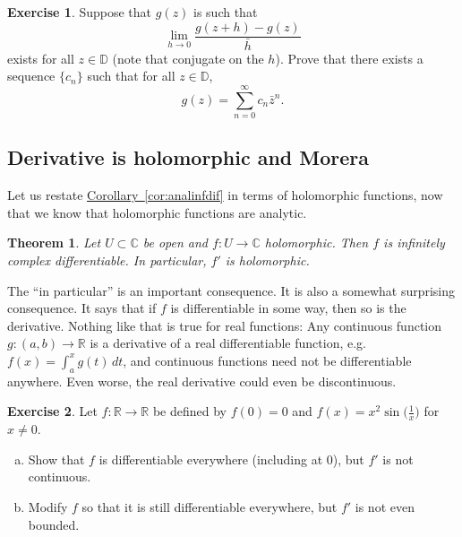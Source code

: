 \documentclass[12pt,openany]{book}
\newcommand{\C}{{\mathbb{C}}}
\newcommand{\R}{{\mathbb{R}}}
\newcommand{\D}{{\mathbb{D}}}
\theoremstyle{plain}
\newtheorem{thm}{Theorem}[section]
\theoremstyle{remark}
\theoremstyle{definition}
\newenvironment{exbox}{%
    \def\FrameCommand{\vrule width 1pt \relax\hspace{10pt}}%
    \MakeFramed{\advance\hsize-\width\FrameRestore}%
}{%
    \endMakeFramed
}
\newenvironment{exparts}{%
    \leavevmode\begin{enumerate}[a),noitemsep,topsep=0pt,parsep=0pt,partopsep=0pt]
}{%
    \end{enumerate}
}
\theoremstyle{exercise}
\newtheorem{exercise}{Exercise}[section]
\theoremstyle{example}
\newcommand{\corref}[1]{\hyperref[#1]{Corollary~\ref*{#1}}}
\begin{document}
\begin{exbox}
\begin{exercise}
Suppose that $g(z)$ is such that
\begin{equation*}
\lim_{h \to 0}
\frac{g(z+h)-g(z)}{\bar{h}}
\end{equation*}
exists for all $z \in \D$ (note that conjugate on the $h$).
Prove that there exists
a sequence $\{ c_n \}$ such that for all $z \in \D$,
\begin{equation*}
g(z) = \sum_{n=0}^\infty c_n \bar{z}^n .
\end{equation*}
\end{exercise}
\end{exbox}

\subsection{Derivative is holomorphic and Morera}

Let us restate \corref{cor:analinfdif} in terms of
holomorphic functions, now that we know that holomorphic functions are
analytic.

\begin{thm} \label{thm:holfuncinfder}
Let $U \subset \C$ be open and $f \colon U \to \C$ holomorphic.  Then
$f$ is infinitely complex differentiable.  In particular, $f'$ is
holomorphic.
\end{thm}

The ``in particular'' is an important consequence.  It is also a somewhat
surprising consequence.
It says that if $f$ is differentiable in some way,
then so is the derivative.  Nothing like that is true for real functions:
Any continuous function $g \colon (a,b) \to \R$ is a derivative
of a real differentiable function, e.g.\ $f(x) = \int_a^x g(t)\,dt$,
and continuous functions need not be differentiable anywhere.
Even worse, the real derivative could even be discontinuous.

\begin{exbox}
\begin{exercise}
Let $f \colon \R \to \R$ be defined by $f(0) = 0$ and $f(x) = x^2
\sin\bigl( \frac{1}{x} \bigr)$ for $x \not= 0$.
\begin{exparts}
\item
Show that $f$ is
differentiable everywhere (including at $0$), but $f'$ is not continuous.
\item
Modify $f$ so that it is still differentiable everywhere, but $f'$ is not
even bounded.
\end{exparts}
\end{exercise}
\end{exbox}
\end{document}
